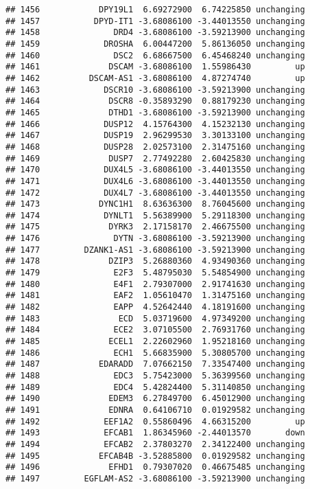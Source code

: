 \documentclass[]{article}
\begin{document}
\begin{verbatim}
## 1456            DPY19L1  6.69272900  6.74225850 unchanging
## 1457           DPYD-IT1 -3.68086100 -3.44013550 unchanging
## 1458               DRD4 -3.68086100 -3.59213900 unchanging
## 1459             DROSHA  6.00447200  5.86136050 unchanging
## 1460               DSC2  6.68667500  6.45468240 unchanging
## 1461              DSCAM -3.68086100  1.55986430         up
## 1462          DSCAM-AS1 -3.68086100  4.87274740         up
## 1463             DSCR10 -3.68086100 -3.59213900 unchanging
## 1464              DSCR8 -0.35893290  0.88179230 unchanging
## 1465              DTHD1 -3.68086100 -3.59213900 unchanging
## 1466             DUSP12  4.15764300  4.15232130 unchanging
## 1467             DUSP19  2.96299530  3.30133100 unchanging
## 1468             DUSP28  2.02573100  2.31475160 unchanging
## 1469              DUSP7  2.77492280  2.60425830 unchanging
## 1470             DUX4L5 -3.68086100 -3.44013550 unchanging
## 1471             DUX4L6 -3.68086100 -3.44013550 unchanging
## 1472             DUX4L7 -3.68086100 -3.44013550 unchanging
## 1473            DYNC1H1  8.63636300  8.76045600 unchanging
## 1474             DYNLT1  5.56389900  5.29118300 unchanging
## 1475              DYRK3  2.17158170  2.46675500 unchanging
## 1476               DYTN -3.68086100 -3.59213900 unchanging
## 1477         DZANK1-AS1 -3.68086100 -3.59213900 unchanging
## 1478              DZIP3  5.26880360  4.93490360 unchanging
## 1479               E2F3  5.48795030  5.54854900 unchanging
## 1480               E4F1  2.79307000  2.91741630 unchanging
## 1481               EAF2  1.05610470  1.31475160 unchanging
## 1482               EAPP  4.52642440  4.18191600 unchanging
## 1483                ECD  5.03719600  4.97349200 unchanging
## 1484               ECE2  3.07105500  2.76931760 unchanging
## 1485              ECEL1  2.22602960  1.95218160 unchanging
## 1486               ECH1  5.66835900  5.30805700 unchanging
## 1487            EDARADD  7.07662150  7.33547400 unchanging
## 1488               EDC3  5.75423000  5.36399560 unchanging
## 1489               EDC4  5.42824400  5.31140850 unchanging
## 1490              EDEM3  6.27849700  6.45012900 unchanging
## 1491              EDNRA  0.64106710  0.01929582 unchanging
## 1492             EEF1A2  0.55860496  4.66315200         up
## 1493             EFCAB1  1.86345960 -2.44013570       down
## 1494             EFCAB2  2.37803270  2.34122400 unchanging
## 1495            EFCAB4B -3.52885800  0.01929582 unchanging
## 1496              EFHD1  0.79307020  0.46675485 unchanging
## 1497         EGFLAM-AS2 -3.68086100 -3.59213900 unchanging

\end{verbatim}
\end{document}
